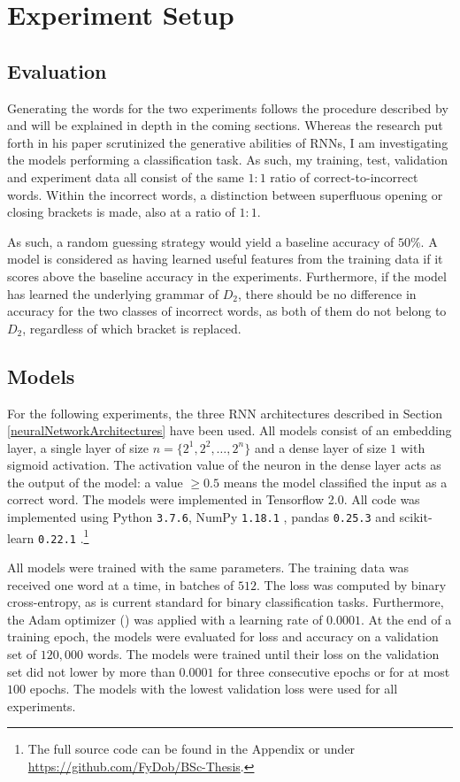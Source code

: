 \section{Experiment Setup}\label{ch:experimentSetup}
\subsection{Evaluation}\label{evaluation}
Generating the words for the two experiments follows the procedure described by \cite{Bernardy2018} and will be explained in depth in the coming sections. Whereas the research put forth in his paper scrutinized the generative abilities of RNNs, I am investigating the models performing a classification task. As such, my training, test, validation and experiment data all consist of the same $1{:}1$ ratio of correct-to-incorrect words. Within the incorrect words, a distinction between superfluous opening or closing brackets is made, also at a ratio of $1{:}1$.

As such, a random guessing strategy would yield a baseline accuracy of $50\%$. A model is considered as having learned useful features from the training data if it scores above the baseline accuracy in the experiments. Furthermore, if the model has learned the underlying grammar of $D_{2}$, there should be no difference in accuracy for the two classes of incorrect words, as both of them do not belong to $D_{2}$, regardless of which bracket is replaced.

\subsection{Models}\label{models}
For the following experiments, the three RNN architectures described in Section \ref{neuralNetworkArchitectures} have been used. All models consist of an embedding layer, a single layer of size $n = \lbrace 2^{1}, 2^{2}, \dots, 2^{n} \rbrace$ and a dense layer of size $1$ with sigmoid activation. The activation value of the neuron in the dense layer acts as the output of the model: a value $\geq 0.5$ means the model classified the input as a correct word. The models were implemented in Tensorflow 2.0. All code was implemented using Python \texttt{3.7.6}, NumPy \texttt{1.18.1} \citep{Mckinney2011}, pandas \texttt{0.25.3} \citep{Oliphant2006} and scikit-learn \texttt{0.22.1} \citep{scikit-learn2011}.\footnote{The full source code can be found in the Appendix or under \url {https://github.com/FyDob/BSc-Thesis}.}

All models were trained with the same parameters. The training data was received one word at a time, in batches of $512$. The loss was computed by binary cross-entropy, as is current standard for binary classification tasks. Furthermore, the Adam optimizer (\cite{Kingma2014}) was applied with a learning rate of $0.0001$. At the end of a training epoch, the models were evaluated for loss and accuracy on a validation set of $120{,}000$ words. The models were trained until their loss on the validation set did not lower by more than $0.0001$ for three consecutive epochs or for at most $100$ epochs. The models with the lowest validation loss were used for all experiments.


